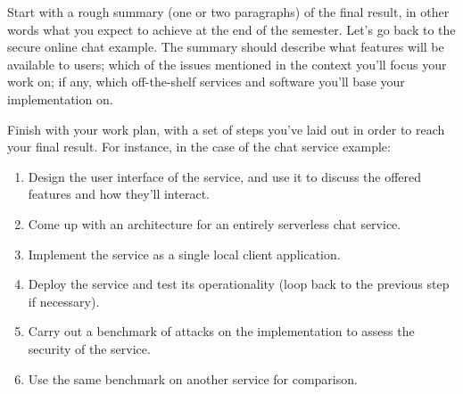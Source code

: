 \documentclass{article}
\begin{document}
Start with a rough summary (one or two paragraphs) of the final result, in other words what you expect to achieve at the end of the semester. Let's go back to the secure online chat example. The summary should describe what features will be available to users; which of the issues mentioned in the context you'll focus your work on; if any, which off-the-shelf services and software you'll base your implementation on.

Finish with your work plan, with a set of steps you've laid out in order to reach your final result.
For instance, in the case of the chat service example:
\begin{enumerate}
    \item Design the user interface of the service, and use it to discuss the offered features and how they'll interact.
    \item Come up with an architecture for an entirely serverless chat service.
    \item Implement the service as a single local client application.
    \item Deploy the service and test its operationality (loop back to the previous step if necessary).
    \item Carry out a benchmark of attacks on the implementation to assess the security of the service.
    \item Use the same benchmark on another service for comparison.
\end{enumerate}



\end{document}
